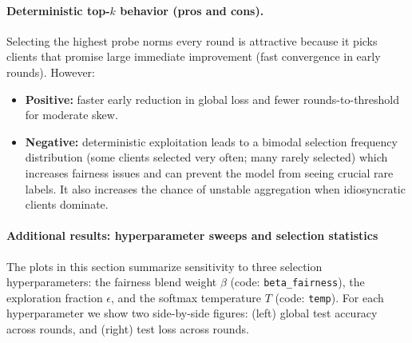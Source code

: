 \documentclass[10pt,twocolumn,letterpaper]{article}
\begin{document}
\paragraph{Deterministic top-$k$ behavior (pros and cons).}
Selecting the highest probe norms every round is attractive because it picks clients that promise large immediate improvement (fast convergence in early rounds). However:
\begin{itemize}
  \item \textbf{Positive:} faster early reduction in global loss and fewer rounds-to-threshold for moderate skew.
  \item \textbf{Negative:} deterministic exploitation leads to a bimodal selection frequency distribution (some clients selected very often; many rarely selected) which increases fairness issues and can prevent the model from seeing crucial rare labels. It also increases the chance of unstable aggregation when idiosyncratic clients dominate.
\end{itemize}







\paragraph{Additional results: hyperparameter sweeps and selection statistics}

The plots in this section summarize sensitivity to three selection hyperparameters: the fairness blend weight $\beta$ (code: \texttt{beta\_fairness}), the exploration fraction $\epsilon$, and the softmax temperature $T$ (code: \texttt{temp}). For each hyperparameter we show two side-by-side figures: (left) global test accuracy across rounds, and (right) test loss across rounds.




\label{sec:plots-beta}
\end{document}
